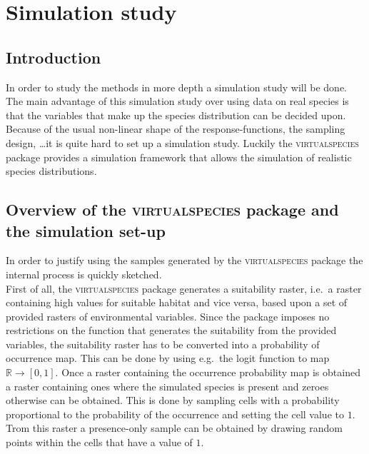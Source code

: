 \chapter{Simulation study}
\label{chap:SimulationStudy}

\section{Introduction}
In order to study the methods in more depth a simulation study will be done. The main advantage of this simulation study over using data on real species is that the variables that make up the species distribution can be decided upon. Because of the usual non-linear shape of the response-functions, the sampling design, \dots it is quite hard to set up a simulation study. Luckily the
\textsc{virtualspecies} package \parencite{virtualspecies, leroy2015virtualspecies} provides a simulation framework that allows the simulation of realistic species distributions. \\

\section{Overview of the \textsc{virtualspecies} package and the simulation set-up}
In order to justify using the samples generated by the \textsc{virtualspecies} package the internal process is quickly sketched. \\

First of all, the \textsc{virtualspecies} package generates a suitability raster, i.e.\ a raster containing high values for suitable habitat and vice versa, based upon a set of provided rasters of environmental variables. Since the package imposes no restrictions on the function that generates the suitability from the provided variables, the suitability raster has to be converted into a probability of occurrence map. This can be done by using e.g.\ the logit function to map $\mathbb{R} \to [0,1]$. Once a raster containing the occurrence probability map is obtained a raster containing ones where the simulated species is present and zeroes otherwise can be obtained. This is done by sampling cells with a probability proportional to the probability of the occurrence and setting the cell value to $1$. Trom this raster a presence-only sample can be obtained by drawing random points within the cells that have a value of $1$.\\

